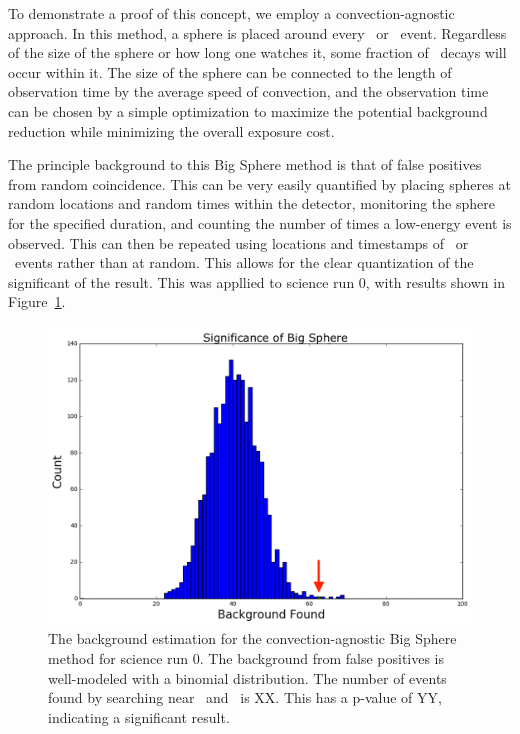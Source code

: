 To demonstrate a proof of this concept, we employ a convection-agnostic approach. In this method, a sphere is placed around every \Po~or \BiPo~event. Regardless of the size of the sphere or how long one watches it, some fraction of \Pb~decays will occur within it. The size of the sphere can be connected to the length of observation time by the average speed of convection, and the observation time can be chosen by a simple optimization to maximize the potential background reduction while minimizing the overall exposure cost.

The principle background to this Big Sphere method is that of false positives from random coincidence. This can be very easily quantified by placing spheres at random locations and random times within the detector, monitoring the sphere for the specified duration, and counting the number of times a low-energy event is observed. This can then be repeated using locations and timestamps of \Po~or \BiPo~events rather than at random. This allows for the clear quantization of the significant of the result. This was appllied to science run 0, with results shown in Figure~\ref{fig:bs_sr0}.

\begin{figure}[htb]
    \includegraphics[width=\textwidth]{figures/rnveto/BigSphere}
    \caption{The background estimation for the convection-agnostic Big Sphere method for science run 0. The background from false positives is well-modeled with a binomial distribution. The number of events found by searching near \Po~and \BiPo~is XX. This has a p-value of YY, indicating a significant result.}\label{fig:bs_sr0}
\end{figure}

